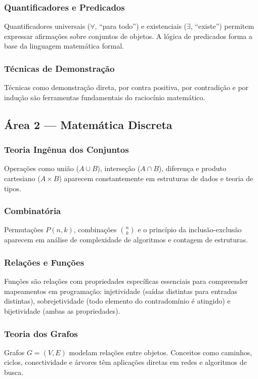 \documentclass[12pt, a4paper]{article}
\begin{document}
\subsubsection*{Quantificadores e Predicados}
Quantificadores universais ($\forall$, ``para todo'') e existenciais ($\exists$, ``existe'')
permitem expressar afirmações sobre conjuntos de objetos. A lógica de predicados forma a
base da linguagem matemática formal.

\subsubsection*{Técnicas de Demonstração}
Técnicas como demonstração direta, por contra positiva, por contradição e por indução são
ferramentas fundamentais do raciocínio matemático.

\subsection*{Área 2 --- Matemática Discreta}

\subsubsection*{Teoria Ingênua dos Conjuntos}
Operações como união ($A \cup B$), interseção ($A \cap B$), diferença e produto cartesiano
($A \times B$) aparecem constantemente em estruturas de dados e teoria de tipos.

\subsubsection*{Combinatória}
Permutações $P(n,k)$, combinações $\binom{n}{k}$ e o princípio da inclusão-exclusão
aparecem em análise de complexidade de algoritmos e contagem de estruturas.

\subsubsection*{Relações e Funções}
Funções são relações com propriedades específicas essenciais para compreender mapeamentos
em programação: injetividade (saídas distintas para entradas distintas), sobrejetividade
(todo elemento do contradomínio é atingido) e bijetividade (ambas as propriedades).

\subsubsection*{Teoria dos Grafos}
Grafos $G = (V, E)$ modelam relações entre objetos. Conceitos como caminhos, ciclos,
conectividade e árvores têm aplicações diretas em redes e algoritmos de busca.
\end{document}
